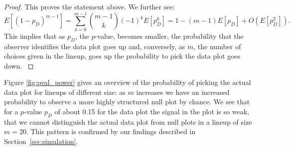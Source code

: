 \documentclass{article}
\newcommand{\red}[1]{{\color{red} #1}}
\begin{document}
\begin{proof}
{This proves the statement above. We further see:
\[
E\left[ (1 - p_D)^{m-1}\right] =  \sum_{k=0}^{m-1} {m-1 \choose k} (-1)^k E[p_D^k] = 1-(m-1)E[p_D] + O(E[p_D^2]).
\]
This implies that as $p_D$, the $p$-value, becomes smaller, the probability that the observer identifies the data plot goes up and,
conversely, as $m$, the number of choices given in the lineup, goes up the probability to pick the data plot  goes down. 
}
%
%
%
%
%
%
\end{proof}



Figure \ref{fig:pval_power} gives an overview of the probability of picking the actual data plot for lineups of different size: as $m$ increases we have an increased probability to observe a more highly structured null plot by chance. We see that for a $p$-value $p_D$ of about 0.15 for the data plot the signal in the plot is so weak, that we cannot distinguish the actual data plot from null plots in a lineup of size $m=20$.  This pattern is confirmed by our findings described in Section~\ref{sec:simulation}.
\end{document}
